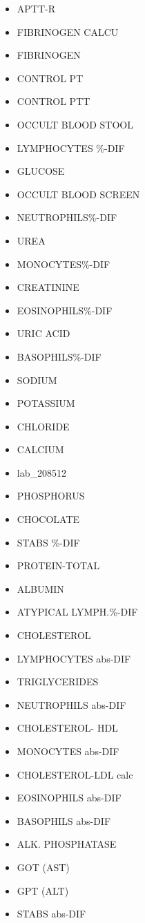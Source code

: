 \documentclass[a4paper,12pt]{article}
\begin{document}
\begin{appendices}
\begin{itemize}
   			\item APTT-R
   			\item FIBRINOGEN CALCU
   			\item FIBRINOGEN
   			\item CONTROL PT
   			\item CONTROL PTT
   			\item OCCULT BLOOD STOOL
   			\item LYMPHOCYTES \%-DIF
   			\item GLUCOSE
   			\item OCCULT BLOOD SCREEN
   			\item NEUTROPHILS\%-DIF
   			\item UREA
   			\item MONOCYTES\%-DIF
   			\item CREATININE
   			\item EOSINOPHILS\%-DIF
   			\item URIC ACID
   			\item BASOPHILS\%-DIF
   			\item SODIUM
   			\item POTASSIUM
   			\item CHLORIDE
   			\item CALCIUM
   			\item lab\_208512
   			\item PHOSPHORUS
   			\item CHOCOLATE
   			\item STABS \%-DIF
   			\item PROTEIN-TOTAL
   			\item ALBUMIN
   			\item ATYPICAL LYMPH.\%-DIF
   			\item CHOLESTEROL
   			\item LYMPHOCYTES abs-DIF
   			\item TRIGLYCERIDES
   			\item NEUTROPHILS abs-DIF
   			\item CHOLESTEROL- HDL
   			\item MONOCYTES abs-DIF
   			\item CHOLESTEROL-LDL calc
   			\item EOSINOPHILS abs-DIF
   			\item BASOPHILS abs-DIF
   			\item ALK. PHOSPHATASE
   			\item GOT (AST)
   			\item GPT (ALT)
   			\item STABS abs-DIF

\end{itemize}
\end{appendices}
\end{document}
